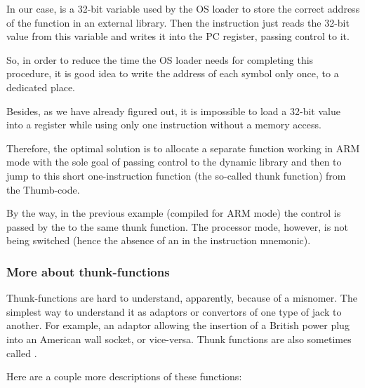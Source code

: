 In our case,  is a 32-bit variable used by the \ac{OS} loader to store the correct address of the function in an external library. 
Then the  instruction just reads the 32-bit value from this variable and writes it into the \ac{PC} register, passing control to it.

So, in order to reduce the time the \ac{OS} loader needs for completing this procedure, 
it is good idea to write the address of each symbol only once, to a dedicated place.

Besides, as we have already figured out, it is impossible to load a 32-bit value into a register 
while using only one instruction without a memory access.

Therefore, the optimal solution is to allocate a separate function working in ARM mode with the sole 
goal of passing control to the dynamic library and then to jump to this short one-instruction function (the so-called \gls{thunk function}) from the Thumb-code.

By the way, in the previous example (compiled for ARM mode) the control is passed by the  to the 
same \gls{thunk function}.
The processor mode, however, is not being switched (hence the absence of an  in the instruction mnemonic).

\subsubsection{More about thunk-functions}

Thunk-functions are hard to understand, apparently, because of a misnomer.
The simplest way to understand it as adaptors or convertors of one type of jack to another.
For example, an adaptor allowing the insertion of a British power plug into an American wall socket, or vice-versa. 
Thunk functions are also sometimes called .

Here are a couple more descriptions of these functions:

